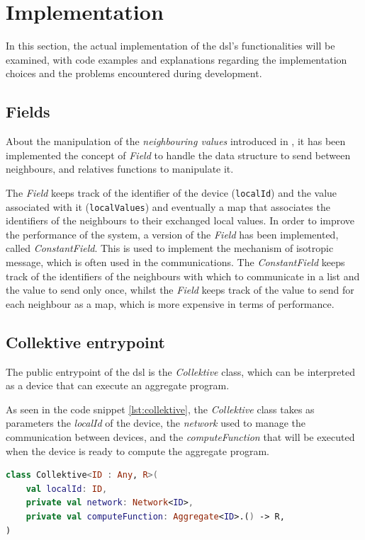 \section{Implementation}
\label{sec:implementation}
In this section, the actual implementation of the \ac{dsl}'s functionalities will be examined, with code examples and explanations
regarding the implementation choices and the problems encountered during development.

\subsection{Fields}
\label{subsec:fields}
About the manipulation of the \emph{neighbouring values} introduced in , it has been implemented
the concept of \emph{Field} to handle the data structure to send between neighbours, and relatives functions to manipulate it.

The \emph{Field} keeps track of the identifier of the device (\texttt{localId}) and the value associated with it
(\texttt{localValues}) and eventually a map that associates the identifiers of the neighbours to their exchanged local values.
In order to improve the performance of the system, a version of the \emph{Field} has been implemented, called \emph{ConstantField}.
This is used to implement the mechanism of isotropic message, which is often used in the communications.
The \emph{ConstantField} keeps track of the identifiers of the neighbours with which to communicate in a list and the value to send only once,
whilst the \emph{Field} keeps track of the value to send for each neighbour as a map, which is more expensive in terms of performance.

\subsection{Collektive entrypoint}
\label{subsec:collektive-entrypoint}
The public entrypoint of the \ac{dsl} is the \emph{Collektive} class, which can be interpreted as a device that can
execute an aggregate program.

As seen in the code snippet \ref{lst:collektive}, the \emph{Collektive} class takes as parameters the \emph{localId} of the device,
the \emph{network} used to manage the communication between devices, and the \emph{computeFunction} that will be executed
when the device is ready to compute the aggregate program.

\begin{lstlisting}[language=kt,label={lst:collektive}, caption={The signature of the \texttt{Collektive} class.}]
class Collektive<ID : Any, R>(
    val localId: ID,
    private val network: Network<ID>,
    private val computeFunction: Aggregate<ID>.() -> R,
)
\end{lstlisting}

